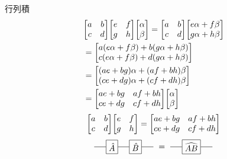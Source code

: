 \documentclass[dvipdfm]{beamer}
\begin{document}
\begin{frame}{行列積}
    \begin{equation*}
        \begin{split}
            &
            \mqty[
                a & b
                \\
                c & d
            ]
            \mqty[
                e & f
                \\
                g & h
            ]
            \mqty[\alpha \\ \beta]
            =
            \mqty[
                a & b
                \\
                c & d
            ]
            \mqty[
                e\alpha+f\beta
                \\
                g\alpha+h\beta
            ]
            \\
            &=
            \mqty[
                a(e\alpha+f\beta)+b(g\alpha+h\beta)
                \\
                c(e\alpha+f\beta)+d(g\alpha+h\beta)
            ]
            \\
            &=
            \mqty[
                (ae+bg)\alpha+(af+bh)\beta
                \\
                (ce+dg)\alpha+(cf+dh)\beta
            ]
            \\
            &=
            \mqty[
                ae+bg & af+bh
                \\
                ce+dg & cf+dh
            ]
            \mqty[\alpha \\ \beta]
        \end{split}
    \end{equation*}
    \begin{equation*}
        \mqty[
            a & b
            \\
            c & d
        ]
        \mqty[
            e & f
            \\
            g & h
        ]
        =
        \mqty[
            ae+bg & af+bh
            \\
            ce+dg & cf+dh
        ]
    \end{equation*}
    \begin{equation*}
        \vcenter{\hbox{
            \begin{tikzpicture}
                \node at(0,0)[draw,rectangle](A){$\hat{A}$};
                \node at(1,0)[draw,rectangle](B){$\hat{B}$};
                \draw(A.east)--(B.west);
                \draw(A.west)--++(-.5,0);
                \draw(B.east)--++(.5,0);
            \end{tikzpicture}
        }}
        =
        \vcenter{\hbox{
            \begin{tikzpicture}
                \node at(0,0)[draw,rectangle](A){$\widehat{AB}$};
                \draw(A.west)--++(-.5,0);
                \draw(A.east)--++(.5,0);
            \end{tikzpicture}
        }}
    \end{equation*}
\end{frame}
\end{document}
